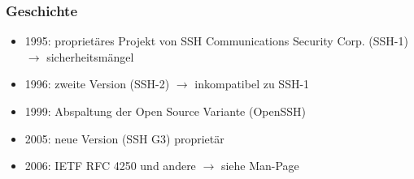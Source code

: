 \begin{frame}
\frametitle{Geschichte}
\begin{itemize}
\item 1995: proprietäres Projekt von SSH Communications Security Corp. (SSH-1) $\rightarrow$ sicherheitsmängel
\pause
\item 1996: zweite Version (SSH-2) $\rightarrow$ inkompatibel zu SSH-1
\pause
\item 1999: Abspaltung der Open Source Variante (OpenSSH)
\pause
\item 2005: neue Version (SSH G3) proprietär
\pause
\item 2006: IETF RFC 4250 und andere $\rightarrow$ siehe Man-Page
\end{itemize}
\end{frame}